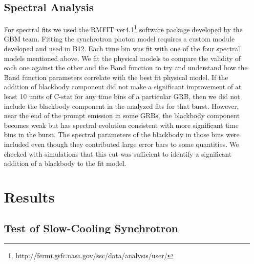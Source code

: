 \subsection{Spectral Analysis}
\label{sec:specan}
For spectral fits we used the RMFIT
ver4.1\footnote{http://fermi.gsfc.nasa.gov/ssc/data/analysis/user/}
software package developed by the GBM team. Fitting the synchrotron
photon model requires a custom module developed and used in B12. Each
time bin was fit with one of the four spectral models mentioned
above. We fit the physical models to compare the validity of each one
against the other and the Band function to try and understand how the
Band function parameters correlate with the best fit physical
model. If the addition of blackbody component did not make a
significant improvement of at least 10 units of C-stat
\cite{Arnaud:2011} for any time bins of a particular GRB, then we did
not include the blackbody component in the analyzed fits for that
burst. However,
near the end of the prompt emission in some GRBs, the blackbody
component becomes weak but has spectral evolution consistent with more
significant time bins in the burst. The spectral parameters of the
blackbody in those bins were included even though they contributed
large error bars to some quantities. We checked with simulations that
this cut was sufficient to identify a significant addition of a
blackbody to the fit model.



\section{Results}
\label{sec:results}
\subsection{Test of Slow-Cooling Synchrotron}
\label{sec:results:scs}

